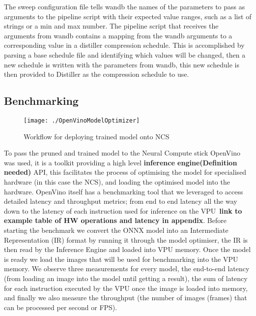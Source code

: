 \documentclass[../Dissertation.tex]{subfiles}
\begin{document}
The sweep configuration file tells \acrshort{wandb} the names of the parameters to pass as arguments to the pipeline script with their expected value ranges, such as a list of strings or a min and max number. 
The pipeline script that receives the arguments from \acrshort{wandb} contains a mapping from the \acrshort{wandb} arguments to a corresponding value in a distiller compression schedule.
This is accomplished by parsing a base schedule file and identifying which values will be changed, then a new schedule is written with the parameters from \acrshort{wandb}, this new schedule is then provided to Distiller as the compression schedule to use.



\subsection{Benchmarking}

\begin{figure}[H]
	\centering
	\texttt{[image: ./OpenVinoModelOptimizer]}
	\caption{Workflow for deploying trained model onto NCS~\autocite{ModelOptimizerDeveloper}}
	\label{fig:OpenVinoWorkflow}
\end{figure}


To pass the pruned and trained model to the Neural Compute stick OpenVino was used, it is a toolkit providing a high level \textbf{inference engine(\color{red}Definition needed)} API, this facilitates the process of optimising the model for specialised hardware (in this case the NCS), and loading the optimised model into the hardware. 
OpenVino itself has a benchmarking tool that we leveraged to access detailed latency and throughput metrics; from end to end latency all the way down to the latency of each instruction used for inference on the VPU~\textbf{\color{red}link to example table of HW operations and latency in appendix}. 
Before starting the benchmark we convert the ONNX model into an Intermediate Representation (IR) format by running it through the model optimiser, the IR is then read by the Inference Engine and loaded into VPU memory.
Once the model is ready we load the images that will be used for benchmarking into the VPU memory.
We observe three measurements for every model, the end-to-end latency (from loading an image into the model until getting a result), the sum of latency for each instruction executed by the VPU once the image is loaded into memory, and finally we also measure the throughput (the number of images (frames) that can be processed per second or FPS).
\end{document}
